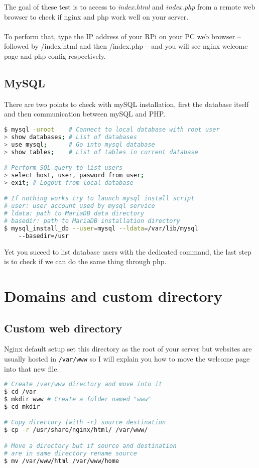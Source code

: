 The goal of these test is to access to \emph{index.html} and \emph{index.php} 
from a remote web browser to check if nginx and php work well on your server. 
\\\\
To perform that, type the IP address of your RPi on your PC web browser -- 
followed by /index.html and then /index.php -- and you will see nginx welcome page 
and php config respectively.

\subsection{MySQL}
There are two points to check with mySQL installation, first the database itself 
and then communication between mySQL and PHP.
\begin{lstlisting}[language=bash,caption=Test mySQL installation]
$ mysql -uroot    # Connect to local database with root user
> show databases; # List of databases
> use mysql;      # Go into mysql database
> show tables;    # List of tables in current database

# Perform SQL query to list users
> select host, user, pasword from user;
> exit; # Logout from local database

# If nothing works try to launch mysql install script
# user: user account used by mysql service
# ldata: path to MariaDB data directory
# basedir: path to MariaDB installation directory
$ mysql_install_db --user=mysql --ldata=/var/lib/mysql 
    --basedir=/usr
\end{lstlisting}

Yet you suceed to list database users with the dedicated command, the last step 
is to check if we can do the same thing through php.
\lstset{language=php,caption=Test php with mySQL}


\section{Domains and custom directory}
\subsection{Custom web directory}
Nginx default setup set this directory as the root of 
your server but websites are usually hosted in \texttt{/var/www} so I will explain 
you how to move the welcome page into that new file.

\begin{lstlisting}[language=bash,caption=Move nginx welcome page]
# Create /var/www directory and move into it
$ cd /var
$ mkdir www # Create a folder named "www"
$ cd mkdir

# Copy directory (with -r) source destination
$ cp -r /usr/share/nginx/html/ /var/www/

# Move a directory but if source and destination
# are in same directory rename source
$ mv /var/www/html /var/www/home
\end{lstlisting} 

